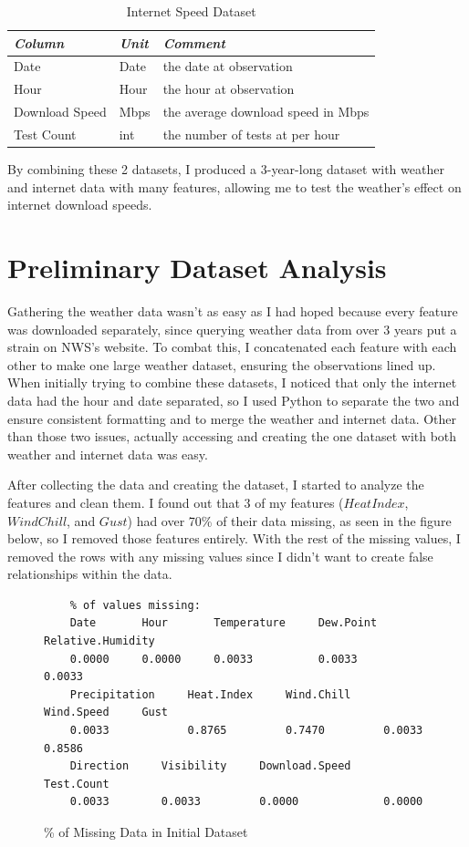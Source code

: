 \documentclass[11pt]{report}
\begin{document}
\begin{table}
    \centering
    \begin{tabular}{lll} \hline
        \emph{Column} & \emph{Unit} & \emph{Comment} \\ \hline
        Date            & Date            & the date at observation\\
        Hour            & Hour            & the hour at observation\\
        Download Speed  & Mbps            & the average download speed in Mbps \\ 
        Test Count      & int             & the number of tests at per hour\\ \hline
    \end{tabular}
    \caption{Internet Speed Dataset}
    \label{tab:Internet_Speed_Dataset}
\end{table}

By combining these 2 datasets, I produced a 3-year-long dataset with weather and internet data with many features, allowing me to test the weather's effect on internet download speeds. 

\section{Preliminary Dataset Analysis}

Gathering the weather data wasn't as easy as I had hoped because every feature was downloaded separately, since querying weather data from over 3 years put a strain on NWS's website. To combat this, I concatenated each feature with each other to make one large weather dataset, ensuring the observations lined up. When initially trying to combine these datasets, I noticed that only the internet data had the hour and date separated, so I used Python to separate the two and ensure consistent formatting and to merge the weather and internet data. Other than those two issues, actually accessing and creating the one dataset with both weather and internet data was easy. 

After collecting the data and creating the dataset, I started to analyze the features and clean them. I found out that 3 of my features ($HeatIndex$, $WindChill$, and $Gust$) had over 70\% of their data missing, as seen in the figure below, so I removed those features entirely. With the rest of the missing values, I removed the rows with any missing values since I didn't want to create false relationships within the data. 

\begin{figure}[ht!]
    \centering
    \begin{verbatim}
    % of values missing:
    Date       Hour       Temperature     Dew.Point      Relative.Humidity 
    0.0000     0.0000     0.0033          0.0033         0.0033 
    Precipitation     Heat.Index     Wind.Chill     Wind.Speed     Gust 
    0.0033            0.8765         0.7470         0.0033         0.8586 
    Direction     Visibility     Download.Speed     Test.Count 
    0.0033        0.0033         0.0000             0.0000
    \end{verbatim}
    \caption{\% of Missing Data in Initial Dataset}
    \label{fig:missing_data}
\end{figure}
\end{document}
